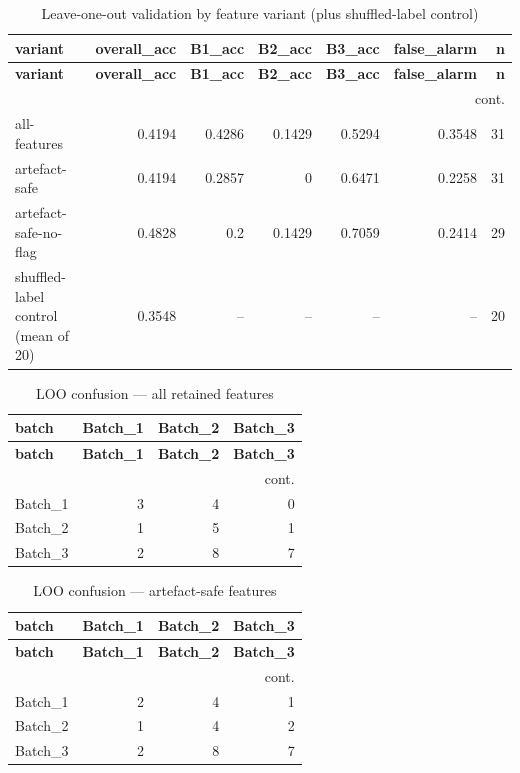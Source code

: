 \documentclass[11pt,a4paper]{article}
\begin{document}
\scriptsize
\begin{longtable}{lrrrrrr}
\caption{Leave-one-out validation by feature variant (plus shuffled-label control)}\label{tab:loo}\\
\toprule
\textbf{variant} & \textbf{overall\_acc} & \textbf{B1\_acc} & \textbf{B2\_acc} & \textbf{B3\_acc} & \textbf{false\_alarm} & \textbf{n} \\
\midrule
\endfirsthead
\toprule \textbf{variant} & \textbf{overall\_acc} & \textbf{B1\_acc} & \textbf{B2\_acc} & \textbf{B3\_acc} & \textbf{false\_alarm} & \textbf{n} \\
\midrule
\endhead
\midrule\multicolumn{7}{r}{\footnotesize cont.}\\\midrule\endfoot
\bottomrule\endlastfoot
all-features & 0.4194 & 0.4286 & 0.1429 & 0.5294 & 0.3548 & 31 \\
artefact-safe & 0.4194 & 0.2857 & 0 & 0.6471 & 0.2258 & 31 \\
artefact-safe-no-flag & 0.4828 & 0.2 & 0.1429 & 0.7059 & 0.2414 & 29 \\
shuffled-label control (mean of 20) & 0.3548 & -- & -- & -- & -- & 20 \\
\end{longtable}
\normalsize
\scriptsize
\begin{longtable}{lrrr}
\caption{LOO confusion --- all retained features}\label{tab:confallfeatures}\\
\toprule
\textbf{batch} & \textbf{Batch\_1} & \textbf{Batch\_2} & \textbf{Batch\_3} \\
\midrule
\endfirsthead
\toprule \textbf{batch} & \textbf{Batch\_1} & \textbf{Batch\_2} & \textbf{Batch\_3} \\
\midrule
\endhead
\midrule\multicolumn{4}{r}{\footnotesize cont.}\\\midrule\endfoot
\bottomrule\endlastfoot
Batch\_1 & 3 & 4 & 0 \\
Batch\_2 & 1 & 5 & 1 \\
Batch\_3 & 2 & 8 & 7 \\
\end{longtable}
\normalsize
\scriptsize
\begin{longtable}{lrrr}
\caption{LOO confusion --- artefact-safe features}\label{tab:confsafe}\\
\toprule
\textbf{batch} & \textbf{Batch\_1} & \textbf{Batch\_2} & \textbf{Batch\_3} \\
\midrule
\endfirsthead
\toprule \textbf{batch} & \textbf{Batch\_1} & \textbf{Batch\_2} & \textbf{Batch\_3} \\
\midrule
\endhead
\midrule\multicolumn{4}{r}{\footnotesize cont.}\\\midrule\endfoot
\bottomrule\endlastfoot
Batch\_1 & 2 & 4 & 1 \\
Batch\_2 & 1 & 4 & 2 \\
Batch\_3 & 2 & 8 & 7 \\
\end{longtable}
\end{document}
